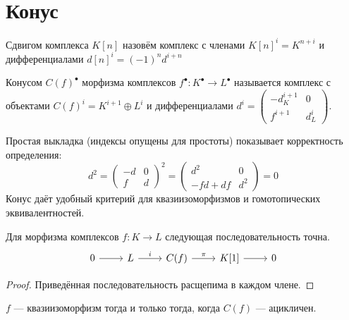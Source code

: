 \documentclass[../main.tex]{subfiles}
\begin{document}
\section{Конус}
\begin{to_def}
Сдвигом комплекса $K[n]$ назовём комплекс с членами $K[n]^i = K^{n+i}$ и дифференциалами $d[n]^i = (-1)^nd^{i+n}$
\end{to_def}
\begin{to_def}
Конусом $C(f)^\bullet$ морфизма комплексов $f^\bullet:K^\bullet\to L^\bullet$ называется комплекс с объектами $C(f)^i = K^{i+1}\oplus L^i$ и дифференциалами $d^i = \begin{pmatrix}-d_K^{i+1}&0\\f^{i+1}&d_L^i\end{pmatrix}$.
\end{to_def}
Простая выкладка (индексы опущены для простоты) показывает корректность определения:
\begin{equation*}
d^2 = \begin{pmatrix}-d&0\\f&d\end{pmatrix}^2 = \begin{pmatrix}d^2&0\\-fd + df&d^2\end{pmatrix} = 0
\end{equation*}
Конус даёт удобный критерий для квазиизоморфизмов и гомотопических эквивалентностей.
\begin{to_suj}\label{3:cone_short_exact}
Для морфизма комплексов $f:K\to L$ следующая последовательность точна.
\begin{equation}\label{3:cone_short_exact_eq}
    \begin{tikzcd}
	0 & L & {C(f)} & {K[1]} & 0
	\arrow[from=1-1, to=1-2]
	\arrow["i", from=1-2, to=1-3]
	\arrow["\pi", from=1-3, to=1-4]
	\arrow[from=1-4, to=1-5]
\end{tikzcd}
\end{equation}
\end{to_suj}
\begin{proof}
Приведённая последовательность расщепима в каждом члене.
\end{proof}
\begin{to_thr}
$f$ --- квазиизоморфизм тогда и только тогда, когда $C(f)$ --- ацикличен.
\end{to_thr}
\end{document}
